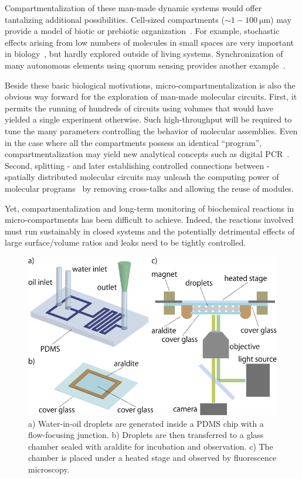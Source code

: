 \documentclass[prl,aps,reprint,
 amsmath,amssymb,superscriptaddress]{revtex4-1}
\begin{document}
	Compartmentalization of these man-made dynamic systems would offer tantalizing additional possibilities. Cell-sized compartments ($\sim 1-\SI{100}{\micro\metre}$) may provide a model of biotic or prebiotic organization~\cite{Szostak2001}. For example, stochastic effects arising from low numbers of molecules in small spaces are very important in biology~\cite{Tkacik2009,Perkins2009}, but hardly explored outside of living systems. Synchronization of many autonomous elements using quorum sensing provides another example~\cite{Taylor2009}. 
	
	Beside these basic biological motivations, micro-compartmentalization is also the obvious way forward for the exploration of man-made molecular circuits. First, it permits the running of hundreds of circuits using volumes that would have yielded a single experiment otherwise. Such high-throughput will be required to tune the many parameters controlling the behavior of molecular assemblies. Even in the case where all the compartments possess an identical ``program'', compartmentalization may yield new analytical concepts such as digital PCR~\cite{Vogelstein1999}. Second, splitting - and later establishing controlled connections between - spatially distributed molecular circuits may unleash the computing power of molecular programs~\cite{Toiya2008} by removing cross-talks and allowing the reuse of modules.
	
 	Yet, compartmentalization and long-term monitoring of biochemical reactions in micro-compartments has been difficult to achieve. Indeed, the reactions involved must run sustainably in closed systems and the potentially detrimental effects of large surface/volume ratios and leaks need to be tightly controlled.
 	
\begin{figure}
\includegraphics{setup}
\caption{a) Water-in-oil droplets are generated inside a PDMS chip with a flow-focusing junction. b) Droplets are then transferred to a glass chamber sealed with araldite for incubation and observation. c) The chamber is placed under a heated stage and observed by fluorescence microscopy.}
\label{fig:setup}
\end{figure}
 	
\end{document}
